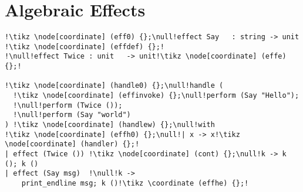 \section{Algebraic Effects}
\newsavebox{\lstbox}
\begin{lrbox}{\lstbox}
    \begin{lstlisting}
!\tikz \node[coordinate] (eff0) {};\null!effect Say   : string -> unit !\tikz \node[coordinate] (effdef) {};!
!\null!effect Twice : unit   -> unit!\tikz \node[coordinate] (effe) {};!

!\tikz \node[coordinate] (handle0) {};\null!handle (
  !\tikz \node[coordinate] (effinvoke) {};\null!perform (Say "Hello");
  !\null!perform (Twice ());
  !\null!perform (Say "world")
) !\tikz \node[coordinate] (handlew) {};\null!with
!\tikz \node[coordinate] (effh0) {};\null!| x -> x!\tikz \node[coordinate] (handler) {};!
| effect (Twice ()) !\tikz \node[coordinate] (cont) {};\null!k -> k (); k ()
| effect (Say msg)  !\null!k ->
    print_endline msg; k ()!\tikz \coordinate (effhe) {};!
    \end{lstlisting}
\end{lrbox}

